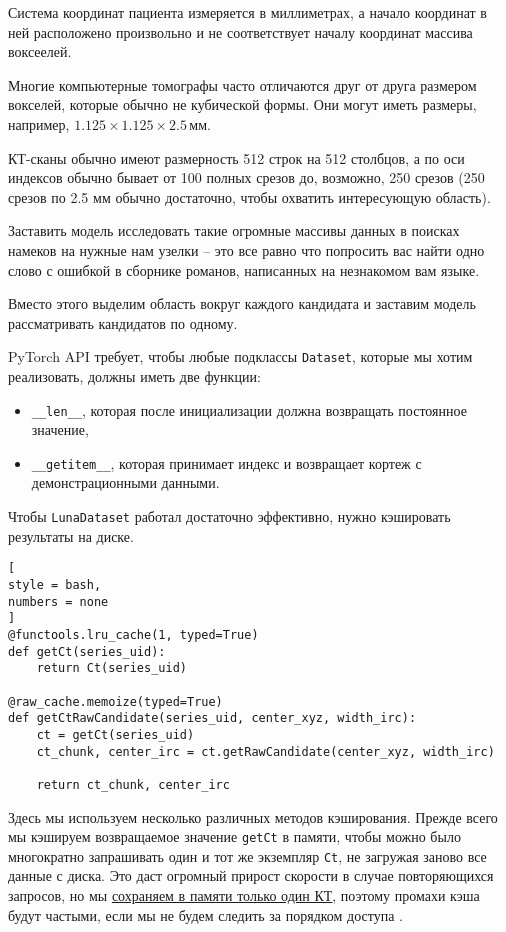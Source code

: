 \documentclass[%
	11pt,
	a4paper,
	utf8,
		]{article}
\begin{document}
Система координат пациента измеряется в миллиметрах, а начало координат в ней расположено произвольно и не соответствует началу координат массива воксеелей.

Многие компьютерные томографы часто отличаются друг от друга размером вокселей, которые обычно не кубической формы. Они могут иметь размеры, например, $1.125 \times 1.125 \times 2.5\, \text{мм}$.

КТ-сканы обычно имеют размерность 512 строк на 512 столбцов, а по оси индексов обычно бывает от 100 полных срезов до, возможно, 250 срезов (250 срезов по 2.5 мм обычно достаточно, чтобы охватить интересующую область).

Заставить модель исследовать такие огромные массивы данных в поисках намеков на нужные нам узелки -- это все равно что попросить вас найти одно слово с ошибкой в сборнике романов, написанных на незнакомом вам языке.

Вместо этого выделим область вокруг каждого кандидата и заставим модель рассматривать кандидатов по одному. 

PyTorch API требует, чтобы любые подклассы \verb|Dataset|, которые мы хотим реализовать, должны иметь две функции:
\begin{itemize}
	\item \verb|__len__|, которая после инициализации должна возвращать постоянное значение,
	
	\item \verb|__getitem__|, которая принимает индекс и возвращает кортеж с демонстрационными данными.
\end{itemize}

Чтобы \verb|LunaDataset| работал достаточно эффективно, нужно кэшировать результаты на диске. 
\begin{lstlisting}[
style = bash,
numbers = none
]
@functools.lru_cache(1, typed=True)
def getCt(series_uid):
    return Ct(series_uid)
    
@raw_cache.memoize(typed=True)
def getCtRawCandidate(series_uid, center_xyz, width_irc):
    ct = getCt(series_uid)
    ct_chunk, center_irc = ct.getRawCandidate(center_xyz, width_irc)
    
    return ct_chunk, center_irc
\end{lstlisting}

Здесь мы используем несколько различных методов кэширования. Прежде всего мы кэшируем возвращаемое значение \verb|getCt| в памяти, чтобы можно было многократно запрашивать один и тот же экземпляр \verb|Ct|, не загружая заново все данные с диска. Это даст огромный прирост скорости в случае повторяющихся запросов, но мы \underline{сохраняем в памяти только один КТ}, поэтому промахи кэша будут частыми, если мы не будем следить за порядком доступа \cite[]{pytorch-2022}.
\end{document}
